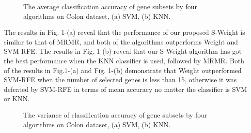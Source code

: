 \documentclass[runningheads,a4paper]{llncs}
\begin{document}
\begin{figure}
\label{fig:fig1}
\centering
{}
\hspace{0.5cm}
\caption{The average classification accuracy of gene subsets by four algorithms on Colon dataset, (a) SVM, (b) KNN.}
\end{figure}

The results in Fig. 1-(a) reveal that the performance of our proposed S-Weight is similar to that of MRMR, and both of the algorithms outperforms Weight and SVM-RFE. The results in Fig. 1-(b) reveal that our S-Weight algorithm has got the best performance when the KNN classifier is used, followed by MRMR. Both of the results in Fig.1-(a) and Fig. 1-(b) demonstrate that Weight outperformed SVM-RFE when the number of selected genes is less than 15, otherwise it was defeated by SVM-RFE in terms of  mean accuracy no matter the classifier is SVM or KNN. 

\begin{figure}
\label{fig:fig2}
\centering
{}
\hspace{0.5cm}
\caption{The variance of classification accuracy of gene subsets by four algorithms on Colon dataset, (a) SVM, (b) KNN.}
\end{figure}
\end{document}
